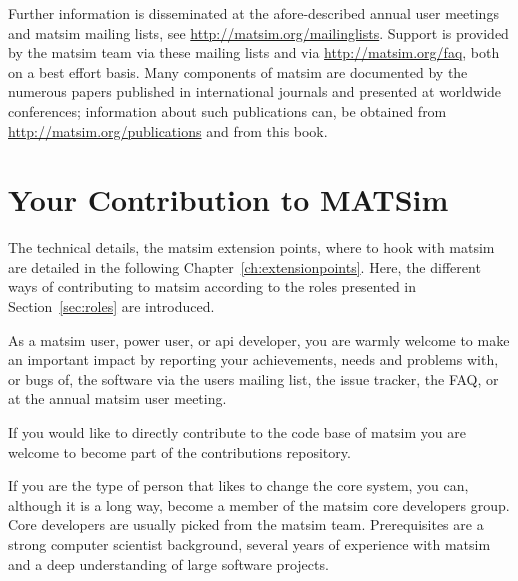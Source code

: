 Further information is disseminated at the afore-described annual user meetings and \gls{matsim} mailing lists, see \url{http://matsim.org/mailinglists}.  Support is provided by the \gls{matsim} team via these mailing lists and via \url{http://matsim.org/faq}, both on a best effort basis. 
Many components of \gls{matsim} are documented by the numerous papers published in international journals and presented at worldwide conferences; information about such publications can, \eg be obtained from \url{http://matsim.org/publications}
and from this book.


\section{Your Contribution to MATSim}
\label{sec:yourcontribution}
The technical details, \ie the \gls{matsim} extension points, where to hook with \gls{matsim} are detailed in the following Chapter~\ref{ch:extensionpoints}.  Here, the different ways of contributing to \gls{matsim} according to the roles presented in Section~\ref{sec:roles} are introduced.

As a \gls{matsim} user, power user, or \gls{api} developer, you are warmly welcome to make an important impact by reporting your achievements, needs and problems with, or bugs of, the software via the users mailing list, the issue tracker, the FAQ, or at the annual \gls{matsim} user meeting. 

If you would like to directly contribute to the code base of \gls{matsim} you are welcome to become part of the \glspl{contribution} repository.

If you are the type of person that likes to change the core system, you can, although it is a long way, become a member of the \gls{matsim} core developers group. Core developers are usually picked from the \gls{matsim} team. Prerequisites are a strong computer scientist background, several years of experience with \gls{matsim} and a deep understanding of large software projects.

